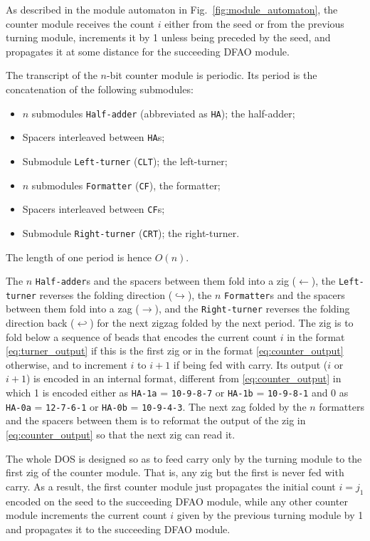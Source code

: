 \documentclass[runningheads]{llncs}
\begin{document}
As described in the module automaton in Fig.~\ref{fig:module_automaton}, the counter module receives the count $i$ either from the seed or from the previous turning module, increments it by 1 unless being preceded by the seed, and propagates it at some distance for the succeeding DFAO module. 

The transcript of the $n$-bit counter module is periodic. 
Its period is the concatenation of the following submodules: 
\begin{itemize}
\item $n$ submodules \texttt{Half-adder} (abbreviated as \texttt{HA}); the half-adder; 
\item Spacers interleaved between \texttt{HA}s; 
\item Submodule \texttt{Left-turner} (\texttt{CLT}); the left-turner; 
\item $n$ submodules \texttt{Formatter} (\texttt{CF}), the formatter; 
\item Spacers interleaved between \texttt{CF}s; 
\item Submodule \texttt{Right-turner} (\texttt{CRT}); the right-turner.
\end{itemize}
The length of one period is hence $O(n)$. 

The $n$ \texttt{Half-adder}s and the spacers between them fold into a zig ($\leftarrow$), the \texttt{Left-turner} reverses the folding direction ($\hookrightarrow$), the $n$ \texttt{Formatter}s and the spacers between them fold into a zag ($\rightarrow$), and the \texttt{Right-turner} reverses the folding direction back ($\hookleftarrow$) for the next zigzag folded by the next period. 
The zig is to fold below a sequence of beads that encodes the current count $i$ in the format \eqref{eq:turner_output} if this is the first zig or in the format \eqref{eq:counter_output} otherwise, and to increment $i$ to $i+1$ if being fed with carry. 
Its output ($i$ or $i+1$) is encoded in an internal format, different from \eqref{eq:counter_output} in which 1 is encoded either as \texttt{HA-1a} = \texttt{10{-}9{-}8{-}7} or \texttt{HA-1b} = \texttt{10-9-8-1} and 0 as \texttt{HA-0a} = \texttt{12-7-6-1} or \texttt{HA-0b} = \texttt{10-9-4-3}. 
The next zag folded by the $n$ formatters and the spacers between them is to reformat the output of the zig in \eqref{eq:counter_output} so that the next zig can read it. 

The whole DOS is designed so as to feed carry only by the turning module to the first zig of the counter module. 
That is, any zig but the first is never fed with carry. 
As a result, the first counter module just propagates the initial count $i = j_1$ encoded on the seed to the succeeding DFAO module, while any other counter module increments the current count $i$ given by the previous turning module by 1 and propagates it to the succeeding DFAO module. 
\end{document}
